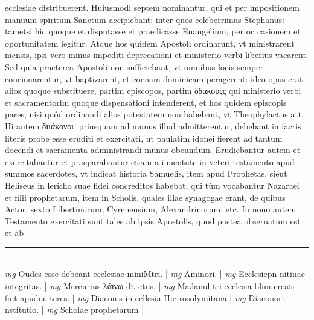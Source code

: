\documentclass{article}
\begin{document}
\begin{pages}
ecclesiae distribuerent. Huiusmodi septem nominantur, qui et per impositionem manuum spiritum Sanctum accipiebant: inter quos celeberrimus Stephanus: tametsi hic quoque et disputasse et praedicasse Euangelium, per oc casionem et oportunitatem legitur. Atque hos quidem Apostoli ordinarunt, vt ministrarent mensis, ipsi vero minus impediti deprecationi et ministerio verbi liberius vacarent. Sed quia praeterea Apostoli non sufficiebant, vt omnibus locis semper concionarentur, vt baptizarent, et coenam dominicam peragerent: ideo opus erat alios quoque substituere, partim episcopos, partim δδακουςς qui ministerio verbi et sacramentorim quoque dispensationi intenderent, et hos quidem episcopis pares, nisi quôd ordinandi alios potestatem non habebant, vt Theophylactus att. Hi autem διιάκονοι, priusquam ad munus illud admitterentur, debebant in facris literis probe esse eruditi et exercitati, ut paulatim idonei fierent ad tantum docendi et sacramenta administrandi munus obeundum. Erudiebantur autem et exercitabantur et praeparabantur etiam a iuuentute in veteri testamento apud summos sacerdotes, vt indicat historia Samuelis, item apud Prophetas, sieut Heliseus in lericho suae fidei concreditos habebat, qui tùm vocabantur Nazaraei et filii prophetarum, item in Scholis, quales illae synagogae erant, de quibus Actor. sexto Libertinorum, Cyrenensium, Alexandrinorum, etc. In nouo autem Testamento exercitati sunt tales ab ipsis Apostolis, quod postea obseruatum est et ab  \pend
\vspace{0.5cm}\noindent
\vspace{0.2cm}\rule{1cm}{0.2pt}\\ 
\hspace{0.2cm}\textit{mg}
\footnotesize Oudes esse debeant ecelesiae miniMtri. 
\normalsize| 
\hspace{0.2cm}\textit{mg}
\footnotesize Aminori. 
\normalsize| 
\hspace{0.2cm}\textit{mg}
\footnotesize Ecclesiepn nitiuae integritas. 
\normalsize| 
\hspace{0.2cm}\textit{mg}
\footnotesize Mercurius λάινω dι. ctus. 
\normalsize| 
\hspace{0.2cm}\textit{mg}
\footnotesize Madanul tri ecclesia blim creati fint apudue teres. 
\normalsize| 
\hspace{0.2cm}\textit{mg}
\footnotesize Diaconis in ecllesia Hie rosolymitana 
\normalsize| 
\hspace{0.2cm}\textit{mg}
\footnotesize Diaconort nstitutio. 
\normalsize| 
\hspace{0.2cm}\textit{mg}
\footnotesize Scholae prophetarum 
\normalsize| 

\end{pages}
\end{document}
